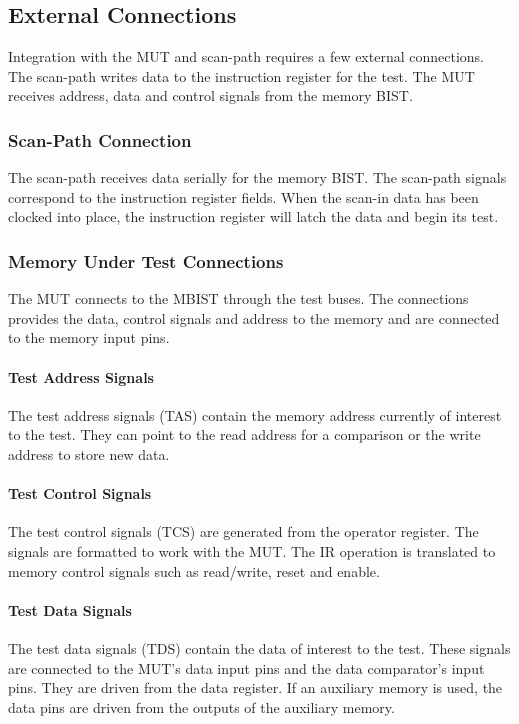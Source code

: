 \subsection{External Connections}
\label{sect:bg-blocks-external-connections}
Integration with the MUT and scan-path requires a few external connections.  The scan-path writes data to the instruction register for the test.  The MUT receives address, data and control signals from the memory BIST.

\subsubsection{Scan-Path Connection}
The scan-path receives data serially for the memory BIST.  The scan-path signals correspond to the instruction register fields.  When the scan-in data has been clocked into place, the instruction register will latch the data and begin its test.  

\subsubsection{Memory Under Test Connections}
The MUT connects to the MBIST through the test buses.  The connections provides the data, control signals and address to the memory and are connected to the memory input pins.  

\paragraph{Test Address Signals}
The test address signals (TAS) contain the memory address currently of interest to the test.  They can point to the read address for a comparison or the write address to store new data.

\paragraph{Test Control Signals}
The test control signals (TCS) are generated from the operator register.  The signals are formatted to work with the MUT.  The IR operation is translated to memory control signals such as read/write, reset and enable.  

\paragraph{Test Data Signals}
The test data signals (TDS) contain the data of interest to the test.  These signals are connected to the MUT's data input pins and the data comparator's input pins.  They are driven from the data register.  If an auxiliary memory is used, the data pins are driven from the outputs of the auxiliary memory.


